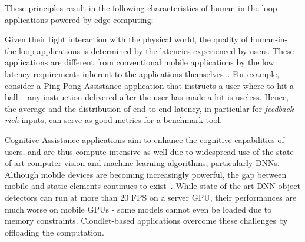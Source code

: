 
These principles result in the following characteristics of human-in-the-loop applications powered by edge computing:

\begin{description}[labelindent=\parindent, listparindent=\parindent, style=unboxed, leftmargin=0cm]
	\item[Latency Sensitive:] Given their tight interaction with the physical world, the quality of human-in-the-loop applications is determined by the latencies experienced by users. 
    These applications are different from conventional mobile applications by the low latency requirements inherent to the applications themselves~\cite{Suzuki2016Vehicle,Chen2017Empirical}. 
    For example, consider a Ping-Pong Assistance application that instructs a user where to hit a ball -- any instruction delivered after the user has made a hit is useless.
  Hence, the average and the distribution of end-to-end latency, in particular for \emph{feedback-rich} inputs, can serve as good metrics for a benchmark tool. 
	
    \item[Compute Intensive:] Cognitive Assistance applications aim to enhance the cognitive capabilities of users, and are thus compute intensive as well due to widespread use of the state-of-art computer vision and machine learning algorithms, particularly \glspl{DNN}.
    Although mobile devices are becoming increasingly powerful, the gap between mobile and static elements continues to exist~\cite{Flinn2012Cyber}. 
    While state-of-the-art DNN object detectors can run at more than 20 \gls{FPS} on a server \gls{GPU}, their performances are much worse on mobile \glspl{GPU} - some models cannot even be loaded due to memory constraints.
    Cloudlet-based applications overcome these challenges by offloading the computation. 

\end{description}


